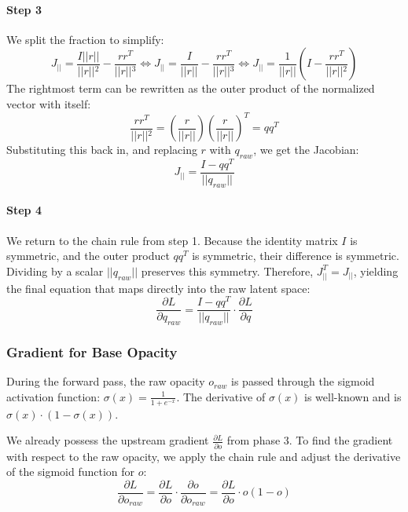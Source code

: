 \paragraph{Step 3} We split the fraction to simplify:
$$
J_{\vert{}\vert{}} =
\frac{I \vert{}\vert{}r\vert{}\vert{}}{\vert{}\vert{}r\vert{}\vert{}^2} - \frac{r r^T}{\vert{}\vert{}r\vert{}\vert{}^3}
\Leftrightarrow
J_{\vert{}\vert{}} =
\frac{I}{\vert{}\vert{}r\vert{}\vert{}} - \frac{r r^T}{\vert{}\vert{}r\vert{}\vert{}^3}
\Leftrightarrow J_{\vert{}\vert{}} = \frac{1}{\vert{}\vert{}r\vert{}\vert{}} \left( I - \frac{r r^T}{\vert{}\vert{}r\vert{}\vert{}^2} \right)
$$
The rightmost term can be rewritten as the outer product of the normalized vector with itself:
$$
\frac{r r^T}{\vert{}\vert{}r\vert{}\vert{}^2} =
\left( \frac{r}{\vert{}\vert{}r\vert{}\vert{}} \right) \left( \frac{r}{\vert{}\vert{}r\vert{}\vert{}} \right)^T =
q q^T
$$
Substituting this back in, and replacing $r$ with $q_{raw}$, we get the Jacobian:
$$
J_{\vert{}\vert{}} =
\frac{I - q q^T}{\vert{}\vert{}q_{raw}\vert{}\vert{}}
$$

\paragraph{Step 4} We return to the chain rule from step 1. Because the identity matrix $I$ is symmetric, and the outer product $q q^T$ is symmetric, their difference is symmetric. Dividing by a scalar $\vert{}\vert{}q_{raw}\vert{}\vert{}$ preserves this symmetry. Therefore, $J_{\vert{}\vert{}}^T = J_{\vert{}\vert{}}$, yielding the final equation that maps directly into the raw latent space:
$$
\frac{\partial L}{\partial q_{raw}} =
\frac{I - q q^T}{\vert{}\vert{}q_{raw}\vert{}\vert{}} \cdot \frac{\partial L}{\partial q}
$$

\subsubsection{Gradient for Base Opacity}

During the forward pass, the raw opacity $o_{raw}$ is passed through the sigmoid activation function: $\sigma(x) = \frac{1}{1 + e^{-x}}$. The derivative of $\sigma(x)$ is well-known and is $\sigma(x) \cdot (1 - \sigma(x))$.

We already possess the upstream gradient $\frac{\partial L}{\partial o}$ from phase 3. To find the gradient with respect to the raw opacity, we apply the chain rule and adjust the derivative of the sigmoid function for $o$:
$$
\frac{\partial L}{\partial o_{raw}} =
\frac{\partial L}{\partial o} \cdot \frac{\partial o}{\partial o_{raw}} =
\frac{\partial L}{\partial o} \cdot o (1 - o)
$$

\newpage